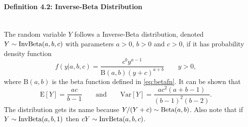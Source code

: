 \clearpage

\paragraph{Definition 4.2: Inverse-Beta Distribution}{~\\
The random variable $Y$ follows a Inverse-Beta distribution, denoted $Y\sim\textnormal{\text{InvBeta}}(a,b,c)$ with parameters $a>0$, $b>0$ and $c>0$,  if it has probability density function
$$
f(y|a,b,c)=\frac{c^by^{a-1}}{\mathrm{B}(a,b)(y+c)^{a+b}} \quad\quad y>0, 
$$
where $\mathrm{B}(a,b)$ is the beta function defined in
\eqref{eq:betafn}. It can be shown that
$$\text{E}[Y]=\frac{ac}{b-1}\quad\quad\text{and}\quad\quad \text{Var}[Y]=\frac{ac^2(a+b-1)}{(b-1)^2(b-2)}.$$
The distribution gets its name because $Y/(Y+c)\sim \textnormal{\text{Beta}}(a,b)$. Also note that if $Y\sim \textnormal{\text{InvBeta}}(a,b,1)$ then $cY\sim \textnormal{\text{InvBeta}}(a,b,c)$.}

\clearpage

